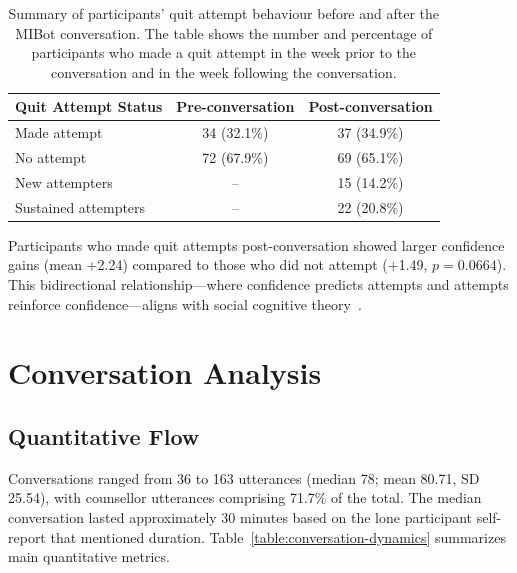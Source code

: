 \begin{table}[ht]
	\centering
	\small
	\setlength{\tabcolsep}{4pt}
	\renewcommand{\arraystretch}{1.1}
	\begin{tabular}{@{}lcc@{}}
		\toprule
		\textbf{Quit Attempt Status} & \textbf{Pre-conversation} & \textbf{Post-conversation} \\
		\midrule
		Made attempt                 & 34 (32.1\%)               & 37 (34.9\%)                \\
		No attempt                   & 72 (67.9\%)               & 69 (65.1\%)                \\
		\midrule
		New attempters               & --                        & 15 (14.2\%)                \\
		Sustained attempters         & --                        & 22 (20.8\%)                \\
		\bottomrule
	\end{tabular}
	\caption[Quit Attempt Behaviour Before and After MIBot]{Summary of participants' quit attempt behaviour before and after the MIBot conversation. The table shows the number and percentage of participants who made a quit attempt in the week prior to the conversation and in the week following the conversation.}
	\label{table:quit_attempts}
\end{table}

Participants who made quit attempts post-conversation showed larger confidence gains (mean +2.24) compared to those who did not attempt (+1.49, $p=0.0664$). This bidirectional relationship---where confidence predicts attempts and attempts reinforce confidence---aligns with social cognitive theory~\citep{Bandura1986}.


\section{Conversation Analysis}
\label{sec:conversation-analysis}

\subsection*{Quantitative Flow}
\label{sec:conversation-dynamics}


Conversations ranged from 36 to 163 utterances (median 78; mean 80.71, SD 25.54), with counsellor utterances comprising 71.7\% of the total. The median conversation lasted approximately 30 minutes based on the lone participant self-report that mentioned duration. Table~\ref{table:conversation-dynamics} summarizes main quantitative metrics.

